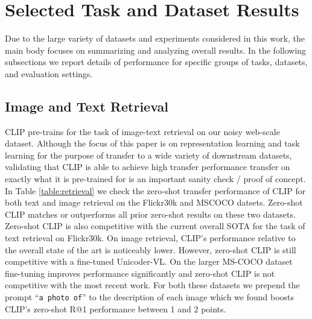 \documentclass{article}
\begin{document}
\section{Selected Task and Dataset Results}
\label{appendix:selected}

Due to the large variety of datasets and experiments considered in this work, the main body focuses on summarizing and analyzing overall results. In the following subsections we report details of performance for specific groups of tasks, datasets, and evaluation settings.

\subsection{Image and Text Retrieval}

CLIP pre-trains for the task of image-text retrieval on our noisy web-scale dataset. Although the focus of this paper is on representation learning and task learning for the purpose of transfer to a wide variety of downstream datasets, validating that CLIP is able to achieve high transfer performance transfer on exactly what it is pre-trained for is an important sanity check / proof of concept. In Table \ref{table:retrieval} we check the zero-shot transfer performance of CLIP for both text and image retrieval on the Flickr30k and MSCOCO datsets. Zero-shot CLIP matches or outperforms all prior zero-shot results on these two datasets. Zero-shot CLIP is also competitive with the current overall SOTA for the task of text retrieval on Flickr30k. On image retrieval, CLIP's performance relative to the overall state of the art is noticeably lower. However, zero-shot CLIP is still competitive with a fine-tuned Unicoder-VL. On the larger MS-COCO dataset fine-tuning improves performance significantly and zero-shot CLIP is not competitive with the most recent work. For both these datasets we prepend the prompt ``\texttt{a photo of}'' to the description of each image which we found boosts CLIP's zero-shot R@1 performance between 1 and 2 points.
\end{document}
